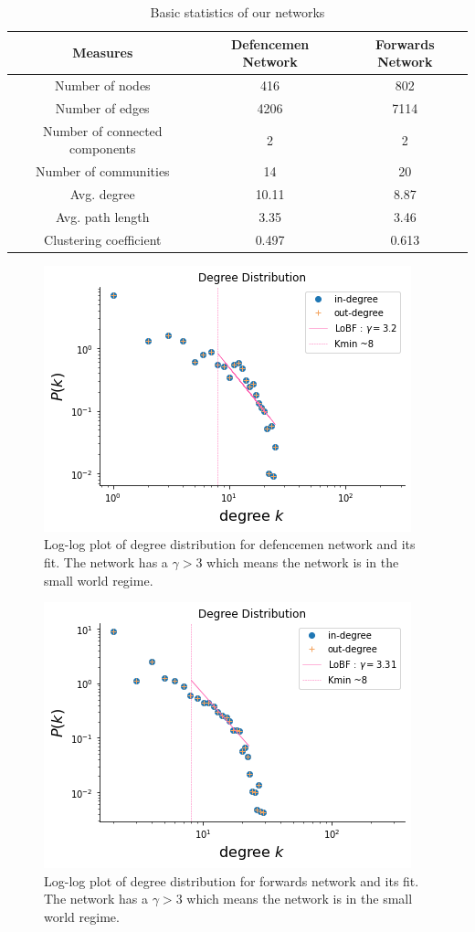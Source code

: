 \documentclass{article}
\begin{document}
\begin{table}[H]
\centering %

\begin{tabular}{ccc}
\hline
Measures & Defencemen Network & Forwards Network  \\
\hline
Number of nodes &  416 & 802  \\
Number of edges & 4206 & 7114\\
Number of connected components & 2 &2 \\
Number of communities & 14 & 20\\
Avg. degree & 10.11 &  8.87\\
Avg. path length & 3.35 & 3.46 \\
Clustering coefficient & 0.497 & 0.613 \\
\hline
\end{tabular}
\caption{Basic statistics of our networks}\label{tab1}
\end{table}

\begin{figure}[H]
\centering
\includegraphics{images/powerlaw.png}
\caption{\label{fig1}Log-log plot of degree distribution for defencemen network and its fit. The network has a $\gamma > 3$ which means the network is in the small world regime.}
\end{figure}

\begin{figure}[H]
\centering
\includegraphics{images/1.png}
\caption{\label{fig2}Log-log plot of degree distribution for forwards network and its fit. The network has a $\gamma > 3$ which means the network is in the small world regime.}
\end{figure}
\end{document}
